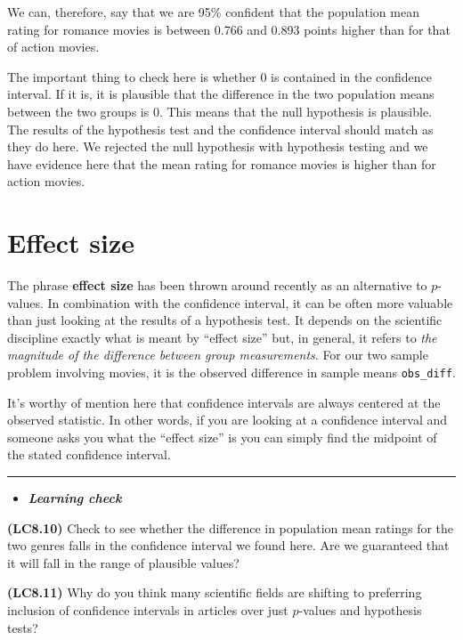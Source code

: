 \documentclass[]{tufte-book}
\let\oldrule=\rule
\renewcommand{\rule}[1]{\oldrule{\linewidth}}
\newenvironment{rmdblock}[1]
  {\begin{shaded*}
  \begin{itemize}
  \renewcommand{\labelitemi}{
    \raisebox{-.7\height}[0pt][0pt]{
    }
  }
  \item
  }
  {
  \end{itemize}
  \end{shaded*}
  }
\newenvironment{learncheck}
  {\begin{rmdblock}{warning}}
  {\end{rmdblock}}
\begin{document}
We can, therefore, say that we are 95\% confident that the population
mean rating for romance movies is between 0.766 and 0.893 points higher
than for that of action movies.

The important thing to check here is whether 0 is contained in the
confidence interval. If it is, it is plausible that the difference in
the two population means between the two groups is 0. This means that
the null hypothesis is plausible. The results of the hypothesis test and
the confidence interval should match as they do here. We rejected the
null hypothesis with hypothesis testing and we have evidence here that
the mean rating for romance movies is higher than for action movies.

\section{Effect size}\label{effect-size}

The phrase \textbf{effect size} has been thrown around recently as an
alternative to \(p\)-values. In combination with the confidence
interval, it can be often more valuable than just looking at the results
of a hypothesis test. It depends on the scientific discipline exactly
what is meant by ``effect size'' but, in general, it refers to \emph{the
magnitude of the difference between group measurements}. For our two
sample problem involving movies, it is the observed difference in sample
means \texttt{obs\_diff}.

It's worthy of mention here that confidence intervals are always
centered at the observed statistic. In other words, if you are looking
at a confidence interval and someone asks you what the ``effect size''
is you can simply find the midpoint of the stated confidence interval.

\begin{center}\rule{0.5\linewidth}{\linethickness}\end{center}

\begin{learncheck}
\textbf{\emph{Learning check}}
\end{learncheck}

\textbf{(LC8.10)} Check to see whether the difference in population mean
ratings for the two genres falls in the confidence interval we found
here. Are we guaranteed that it will fall in the range of plausible
values?

\textbf{(LC8.11)} Why do you think many scientific fields are shifting
to preferring inclusion of confidence intervals in articles over just
\(p\)-values and hypothesis tests?
\end{document}

